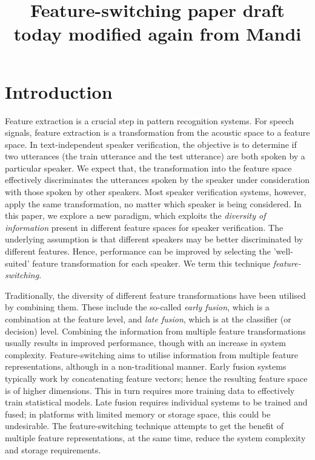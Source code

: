 \documentclass{article}
\title{Feature-switching paper draft today modified again from Mandi}
\begin{document}
\section{Introduction}
\label{sec:intro}
Feature extraction is a crucial step in pattern recognition systems. For
speech signals, feature extraction is a transformation from the acoustic space
to a feature space. In text-independent speaker verification, the objective is
to determine if two utterances (the train utterance and the test utterance) are
both spoken by a particular speaker. We expect that, the transformation into the
feature space effectively discriminates the utterances spoken by the speaker
under consideration with those spoken by other speakers. Most speaker
verification systems, however, apply the same transformation, no matter which
speaker is being considered. In this paper, we explore a new paradigm, which
exploits the \emph{diversity of information} present in different feature spaces
for speaker verification. The underlying assumption is that different speakers
may be better discriminated by different features. Hence, performance can
be improved by selecting the 'well-suited' feature transformation for
each speaker. We term this technique \emph{feature-switching}. 

Traditionally, the diversity of different feature transformations have been
utilised by combining them. These include the so-called \emph{early fusion},
which is a combination at the feature level, and \emph{late fusion}, which is at
the classifier (or decision) level. Combining the information from multiple
feature transformations usually results in improved performance, though
with an increase in system complexity. Feature-switching aims to utilise
information from multiple feature representations, although in a non-traditional
manner. Early fusion systems typically work by concatenating feature vectors;
hence the resulting feature space is of higher dimensions. This in turn requires
more training data to effectively train statistical models. Late fusion requires
individual systems to be trained and fused; in platforms with limited memory or
storage space, this could be undesirable. The feature-switching technique
attempts to get the benefit of multiple feature representations, at the same
time, reduce the system complexity and storage requirements.
\end{document}
